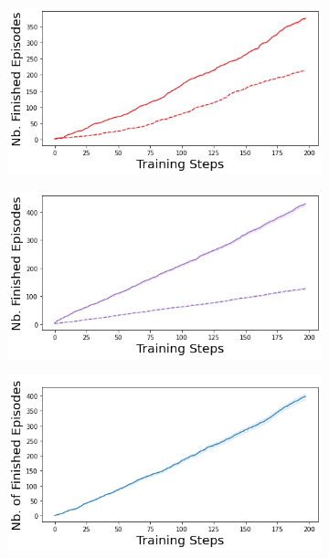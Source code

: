 \begin{figure}
    \begin{subfigure}{.24\textwidth}
        \includegraphics[width=\textwidth]{sections/011_icml2022/resources/acrobot-n_finished_training_episodes-dropout-training-strategy.png}
    \end{subfigure}
    \begin{subfigure}{.24\textwidth}
        \includegraphics[width=\textwidth]{sections/011_icml2022/resources/acrobot-n_finished_training_episodes-ensemble-training-strategy.png}
    \end{subfigure}
    \begin{subfigure}{.24\textwidth}
        \includegraphics[width=\textwidth]{sections/011_icml2022/resources/acrobot-n_finished_training_episodes-dkl-training-strategy.png}

\end{subfigure}
\end{figure}
